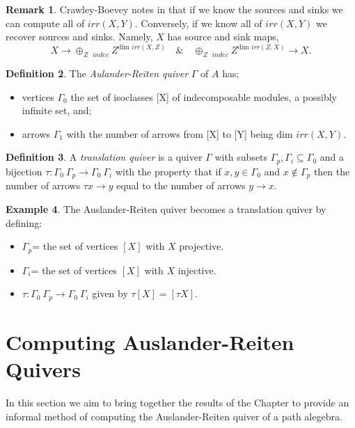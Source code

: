 \documentclass[11.5pt, twoside, a4paper, titlepage]{report}
\theoremstyle{definition}
\newtheorem{mydef}{Definition}[section]
\newtheorem{rem}[mydef]{Remark}
\newtheorem{eg}[mydef]{Example}
\theoremstyle{plain}
\begin{document}
\begin{rem}
 Crawley-Boevey notes in \cite{CB3} that if we know the sources and sinks we can compute all of $irr(X,Y)$. Conversely, if we know all of $irr(X,Y)$ we recover sources and sinks. Namely, $X$ has source and sink maps,
\begin{equation*}
X \to \oplus_{\scriptstyle{Z\text{ } indec}}Z^{\text{dim }irr(X,Z)} \quad \& \quad \oplus_{\scriptstyle{Z\text{ } indec}}Z^{\text{dim }irr(Z, X) }\to X.
\end{equation*}
\end{rem}

\begin{mydef}
The \emph{Aulander-Reiten quiver} $\Gamma$ of $A$ has;
\begin{itemize}
\item vertices $\Gamma_0$ the set of isoclasses [X] of indecomposable modules, a possibly infinite set, and;
\item arrows $\Gamma_1$ with the number of arrows from [X] to [Y] being $\text{dim }irr(X,Y)$.
\end{itemize}
\end{mydef}

\begin{mydef}
A \emph{translation quiver} is a quiver $\Gamma$ with subsets $\Gamma_p, \Gamma_i \subseteq \Gamma_0$ and a bijection $\tau: \Gamma_0\ \Gamma_p \to \Gamma_0 \ \Gamma_i$ with the property that if $x,y \in \Gamma_0$ and $x \notin \Gamma_p$ then the number of arrows $\tau x \to y$ equal to the number of arrows $y \to x$.
\end{mydef}

\begin{eg}
The Auslander-Reiten quiver becomes a translation quiver by defining:
\begin{itemize}
\item $\Gamma_p$= the set of vertices $[X]$ with $X$ projective.
\item $\Gamma_i$= the set of vertices $[X]$ with $X$ injective.
\item $\tau:  \Gamma_0\ \Gamma_p \to \Gamma_0 \ \Gamma_i$ given by $\tau[X]=[\tau X]$.
\end{itemize}
\end{eg}

\section{Computing Auslander-Reiten Quivers}

In this section we aim to bring together the results of the Chapter to provide an informal method of computing the Auslander-Reiten quiver of a path alegebra.
\end{document}
